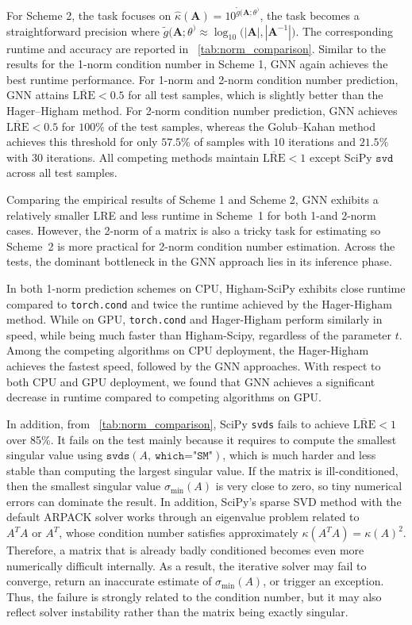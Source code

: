 \documentclass[11pt,a4paper]{article}
\theoremstyle{plain}
\theoremstyle{definition}
\theoremstyle{remark}
\begin{document}
For Scheme 2, the task focuses on $\hat{\kappa}(\mathbf{A}) = 10^{\tilde{g}(\mathbf{A}; \theta^)}$,
the task becomes a straightforward precision where $\tilde{g}(\mathbf{A}; \theta^) \approx \log_{10} \bigl(|\mathbf{A}|,|\mathbf{A}^{-1}|\bigr)$. The corresponding runtime and accuracy are reported in \tablename~\ref{tab:norm_comparison}.
Similar to the results for the 1-norm condition number in Scheme 1, GNN again achieves the best runtime performance. For 1-norm and 2-norm condition number prediction, GNN attains $\overline{\mathrm{LRE}} < 0.5$ for all test samples, which is slightly better than the Hager–Higham method. For 2-norm condition number prediction, GNN achieves $\overline{\mathrm{LRE}} < 0.5$ for $100\%$ of the test samples, whereas the Golub–Kahan method achieves this threshold for only $57.5\%$ of samples with $10$ iterations and $21.5\%$ with $30$ iterations.
All competing methods maintain $\overline{\mathrm{LRE}} < 1$ except SciPy $\texttt{svd}$ across all test samples. 

Comparing the empirical results of Scheme 1 and Scheme 2, GNN exhibits a relatively smaller LRE and less runtime in Scheme~1 for both 1-and 2-norm cases. However, the 2-norm of a matrix is also a tricky task for estimating so Scheme~2 is more practical for 2-norm condition number estimation. Across the tests, the dominant bottleneck in the GNN approach lies in its inference phase. 

In both 1-norm prediction schemes on CPU, Higham-SciPy exhibits close runtime compared to \texttt{torch.cond} and twice the runtime achieved by the Hager-Higham method. While on GPU, \texttt{torch.cond} and Hager-Higham perform similarly in speed, while being much faster than Higham-Scipy, regardless of the parameter $t$. Among the competing algorithms on CPU deployment, the Hager-Higham achieves the fastest speed, followed by the GNN approaches.  With respect to both CPU and GPU deployment, we found that GNN achieves a significant decrease in runtime compared to competing algorithms on GPU. 


In addition, from \tablename~\ref{tab:norm_comparison}, SciPy \texttt{svds} fails to achieve $\overline{\mathrm{LRE}} < 1$ over 85\%. It fails on the test mainly because it requires to compute the smallest singular value using $\texttt{svds}(A,\ \texttt{which="SM"})$, which is much harder and less stable than computing the largest singular value. If the matrix is ill-conditioned, then the smallest singular value \(\sigma_{\min}(A)\) is very close to zero, so tiny numerical errors can dominate the result. In addition, SciPy's sparse SVD method with the default ARPACK solver works through an eigenvalue problem related to $A^{T}A \text{ or } A^{T}$,
whose condition number satisfies approximately $\kappa(A^{T}A) = \kappa(A)^2$. Therefore, a matrix that is already badly conditioned becomes even more numerically difficult internally. As a result, the iterative solver may fail to converge, return an inaccurate estimate of \(\sigma_{\min}(A)\), or trigger an exception.
Thus, the failure is strongly related to the condition number, but it may also reflect solver instability rather than the matrix being exactly singular.
\end{document}
